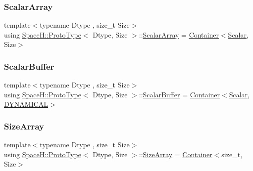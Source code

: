 \subsubsection{\texorpdfstring{Scalar\+Array}{ScalarArray}}
{\footnotesize\ttfamily template$<$typename Dtype , size\+\_\+t Size$>$ \\
using \mbox{\hyperlink{struct_space_h_1_1_proto_type}{Space\+H\+::\+Proto\+Type}}$<$ Dtype, Size $>$\+::\mbox{\hyperlink{struct_space_h_1_1_proto_type_a09ef91dc8a37a044c403f5a833044725}{Scalar\+Array}} =  \mbox{\hyperlink{struct_space_h_1_1_proto_type_a60ee86c74f6f9ebfa78936f6dc1d2b07}{Container}}$<$\mbox{\hyperlink{struct_space_h_1_1_proto_type_af3c8245d83d9db64749882920de5c274}{Scalar}}, Size$>$}

\mbox{\label{struct_space_h_1_1_proto_type_a62c491884996da10377d348a5aabad86}} 
\subsubsection{\texorpdfstring{Scalar\+Buffer}{ScalarBuffer}}
{\footnotesize\ttfamily template$<$typename Dtype , size\+\_\+t Size$>$ \\
using \mbox{\hyperlink{struct_space_h_1_1_proto_type}{Space\+H\+::\+Proto\+Type}}$<$ Dtype, Size $>$\+::\mbox{\hyperlink{struct_space_h_1_1_proto_type_a62c491884996da10377d348a5aabad86}{Scalar\+Buffer}} =  \mbox{\hyperlink{struct_space_h_1_1_proto_type_a60ee86c74f6f9ebfa78936f6dc1d2b07}{Container}}$<$\mbox{\hyperlink{struct_space_h_1_1_proto_type_af3c8245d83d9db64749882920de5c274}{Scalar}}, \mbox{\hyperlink{namespace_space_h_a3e55b9bc2a9e10c08ce8121bce11244a}{D\+Y\+N\+A\+M\+I\+C\+AL}}$>$}

\mbox{\label{struct_space_h_1_1_proto_type_abb1c3c7a06f24576cc47636441331972}} 
\subsubsection{\texorpdfstring{Size\+Array}{SizeArray}}
{\footnotesize\ttfamily template$<$typename Dtype , size\+\_\+t Size$>$ \\
using \mbox{\hyperlink{struct_space_h_1_1_proto_type}{Space\+H\+::\+Proto\+Type}}$<$ Dtype, Size $>$\+::\mbox{\hyperlink{struct_space_h_1_1_proto_type_abb1c3c7a06f24576cc47636441331972}{Size\+Array}} =  \mbox{\hyperlink{struct_space_h_1_1_proto_type_a60ee86c74f6f9ebfa78936f6dc1d2b07}{Container}}$<$size\+\_\+t, Size$>$}

